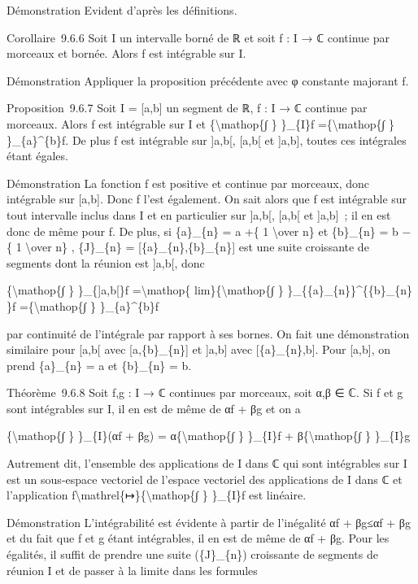 \documentclass[]{article}
\begin{document}
Démonstration Evident d'après les définitions.

Corollaire~9.6.6 Soit I un intervalle borné de ℝ et soit f : I → ℂ
continue par morceaux et bornée. Alors f est intégrable sur I.

Démonstration Appliquer la proposition précédente avec φ constante
majorant \textbar{}f\textbar{}.

Proposition~9.6.7 Soit I = {[}a,b{]} un segment de ℝ, f : I → ℂ continue
par morceaux. Alors f est intégrable sur I et
\{\textbackslash{}mathop\{∫ \} \}\_\{I\}f =\{\textbackslash{}mathop\{∫
\} \}\_\{a\}\^{}\{b\}f. De plus f est intégrable sur {]}a,b{[},
{[}a,b{[} et {]}a,b{]}, toutes ces intégrales étant égales.

Démonstration La fonction \textbar{}f\textbar{} est positive et continue
par morceaux, donc intégrable sur {[}a,b{]}. Donc f l'est également. On
sait alors que \textbar{}f\textbar{} est intégrable sur tout intervalle
inclus dans I et en particulier sur {]}a,b{[}, {[}a,b{[} et {]}a,b{]}~;
il en est donc de même pour f. De plus, si \{a\}\_\{n\} = a +\{ 1
\textbackslash{}over n\} et \{b\}\_\{n\} = b −\{ 1 \textbackslash{}over
n\} , \{J\}\_\{n\} = {[}\{a\}\_\{n\},\{b\}\_\{n\}{]} est une suite
croissante de segments dont la réunion est {]}a,b{[}, donc

\{\textbackslash{}mathop\{∫ \} \}\_\{{]}a,b{[}\}f
=\textbackslash{}mathop\{ lim\}\{\textbackslash{}mathop\{∫ \}
\}\_\{\{a\}\_\{n\}\}\^{}\{\{b\}\_\{n\} \}f =\{\textbackslash{}mathop\{∫
\} \}\_\{a\}\^{}\{b\}f

par continuité de l'intégrale par rapport à ses bornes. On fait une
démonstration similaire pour {[}a,b{[} avec {[}a,\{b\}\_\{n\}{]} et
{]}a,b{]} avec {[}\{a\}\_\{n\},b{]}. Pour {[}a,b{]}, on prend
\{a\}\_\{n\} = a et \{b\}\_\{n\} = b.

Théorème~9.6.8 Soit f,g : I → ℂ continues par morceaux, soit α,β ∈ ℂ. Si
f et g sont intégrables sur I, il en est de même de αf + βg et on a

\{\textbackslash{}mathop\{∫ \} \}\_\{I\}(αf + βg) =
α\{\textbackslash{}mathop\{∫ \} \}\_\{I\}f +
β\{\textbackslash{}mathop\{∫ \} \}\_\{I\}g

Autrement dit, l'ensemble des applications de I dans ℂ qui sont
intégrables sur I est un sous-espace vectoriel de l'espace vectoriel des
applications de I dans ℂ et l'application
f\textbackslash{}mathrel\{↦\}\{\textbackslash{}mathop\{∫ \} \}\_\{I\}f
est linéaire.

Démonstration L'intégrabilité est évidente à partir de l'inégalité
\textbar{}αf + βg\textbar{}≤\textbar{}α\textbar{}\textbar{}f\textbar{} +
\textbar{}β\textbar{}\textbar{}g\textbar{} et du fait que
\textbar{}f\textbar{} et \textbar{}g\textbar{} étant intégrables, il en
est de même de \textbar{}α\textbar{}\textbar{}f\textbar{} +
\textbar{}β\textbar{}\textbar{}g\textbar{}. Pour les égalités, il suffit
de prendre une suite (\{J\}\_\{n\}) croissante de segments de réunion I
et de passer à la limite dans les formules
\end{document}

